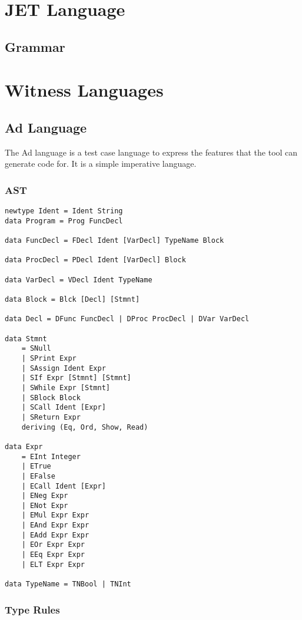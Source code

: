 \appendix

\chapter{JET Language}
\label{appendix:jetLanguage}
\section{Grammar}

\chapter{Witness Languages}
\label{appendix:witnessLanguages}
\section{Ad Language}
The Ad language is a test case language to express the features that the tool can generate code for.
It is a simple imperative language.
\subsection{AST}
\begin{lstlisting}
newtype Ident = Ident String
data Program = Prog FuncDecl

data FuncDecl = FDecl Ident [VarDecl] TypeName Block

data ProcDecl = PDecl Ident [VarDecl] Block

data VarDecl = VDecl Ident TypeName

data Block = Blck [Decl] [Stmnt]

data Decl = DFunc FuncDecl | DProc ProcDecl | DVar VarDecl

data Stmnt
    = SNull
    | SPrint Expr
    | SAssign Ident Expr
    | SIf Expr [Stmnt] [Stmnt]
    | SWhile Expr [Stmnt]
    | SBlock Block
    | SCall Ident [Expr]
    | SReturn Expr
    deriving (Eq, Ord, Show, Read)

data Expr
    = EInt Integer
    | ETrue
    | EFalse
    | ECall Ident [Expr]
    | ENeg Expr
    | ENot Expr
    | EMul Expr Expr
    | EAnd Expr Expr
    | EAdd Expr Expr
    | EOr Expr Expr
    | EEq Expr Expr
    | ELT Expr Expr

data TypeName = TNBool | TNInt
\end{lstlisting}

\subsection{Type Rules}
